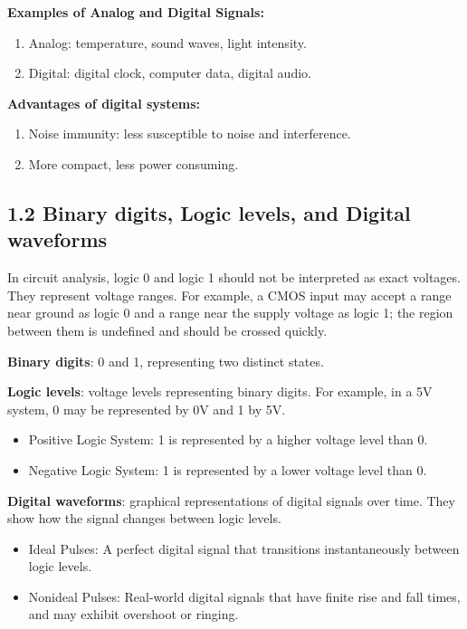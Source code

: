 \documentclass[11pt,a4paper]{article}
\providecommand{\tightlist}{\setlength{\itemsep}{1pt}\setlength{\parskip}{0pt}}
\begin{document}
\textbf{Examples of Analog and Digital Signals:}

\begin{enumerate}
\def\labelenumi{\arabic{enumi}.}
\tightlist
\item
  Analog: temperature, sound waves, light intensity.
\item
  Digital: digital clock, computer data, digital audio.
\end{enumerate}

\textbf{Advantages of digital systems:}

\begin{enumerate}
\def\labelenumi{\arabic{enumi}.}
\tightlist
\item
  Noise immunity: less susceptible to noise and interference.
\item
  More compact, less power consuming.
\end{enumerate}

\subsection{1.2 Binary digits, Logic levels, and Digital
waveforms}\label{binary-digits-logic-levels-and-digital-waveforms}

In circuit analysis, logic 0 and logic 1 should not be interpreted as
exact voltages. They represent voltage ranges. For example, a CMOS input
may accept a range near ground as logic 0 and a range near the supply
voltage as logic 1; the region between them is undefined and should be
crossed quickly.

\textbf{Binary digits}: 0 and 1, representing two distinct states.

\textbf{Logic levels}: voltage levels representing binary digits. For
example, in a 5V system, 0 may be represented by 0V and 1 by 5V.

\begin{itemize}
\tightlist
\item
  Positive Logic System: 1 is represented by a higher voltage level than
  0.
\item
  Negative Logic System: 1 is represented by a lower voltage level than
  0.
\end{itemize}

\textbf{Digital waveforms}: graphical representations of digital signals
over time. They show how the signal changes between logic levels.

\begin{itemize}
\tightlist
\item
  Ideal Pulses: A perfect digital signal that transitions
  instantaneously between logic levels.
\item
  Nonideal Pulses: Real-world digital signals that have finite rise and
  fall times, and may exhibit overshoot or ringing.
\end{itemize}
\end{document}
